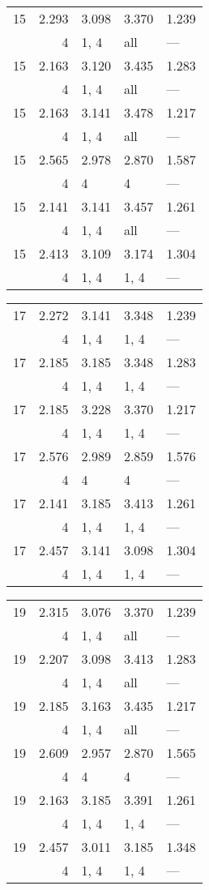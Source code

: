 \begin{tabular}{lrlll}
\toprule
 15 & 2.293 & 3.098 & 3.370 & 1.239 \\
    & 4     & 1, 4  & all   & ---   \\
 15 & 2.163 & 3.120 & 3.435 & 1.283 \\
    & 4     & 1, 4  & all   & ---   \\
 15 & 2.163 & 3.141 & 3.478 & 1.217 \\
    & 4     & 1, 4  & all   & ---   \\
 15 & 2.565 & 2.978 & 2.870 & 1.587 \\
    & 4     & 4     & 4     & ---   \\
 15 & 2.141 & 3.141 & 3.457 & 1.261 \\
    & 4     & 1, 4  & all   & ---   \\
 15 & 2.413 & 3.109 & 3.174 & 1.304 \\
    & 4     & 1, 4  & 1, 4  & ---   \\
\bottomrule
\end{tabular}
\begin{tabular}{lrlll}
\toprule
 17 & 2.272 & 3.141 & 3.348 & 1.239 \\
    & 4     & 1, 4  & 1, 4  & ---   \\
 17 & 2.185 & 3.185 & 3.348 & 1.283 \\
    & 4     & 1, 4  & 1, 4  & ---   \\
 17 & 2.185 & 3.228 & 3.370 & 1.217 \\
    & 4     & 1, 4  & 1, 4  & ---   \\
 17 & 2.576 & 2.989 & 2.859 & 1.576 \\
    & 4     & 4     & 4     & ---   \\
 17 & 2.141 & 3.185 & 3.413 & 1.261 \\
    & 4     & 1, 4  & 1, 4  & ---   \\
 17 & 2.457 & 3.141 & 3.098 & 1.304 \\
    & 4     & 1, 4  & 1, 4  & ---   \\
\bottomrule
\end{tabular}
\begin{tabular}{lrlll}
\toprule
 19 & 2.315 & 3.076 & 3.370 & 1.239 \\
    & 4     & 1, 4  & all   & ---   \\
 19 & 2.207 & 3.098 & 3.413 & 1.283 \\
    & 4     & 1, 4  & all   & ---   \\
 19 & 2.185 & 3.163 & 3.435 & 1.217 \\
    & 4     & 1, 4  & all   & ---   \\
 19 & 2.609 & 2.957 & 2.870 & 1.565 \\
    & 4     & 4     & 4     & ---   \\
 19 & 2.163 & 3.185 & 3.391 & 1.261 \\
    & 4     & 1, 4  & 1, 4  & ---   \\
 19 & 2.457 & 3.011 & 3.185 & 1.348 \\
    & 4     & 1, 4  & 1, 4  & ---   \\
\bottomrule
\end{tabular}
